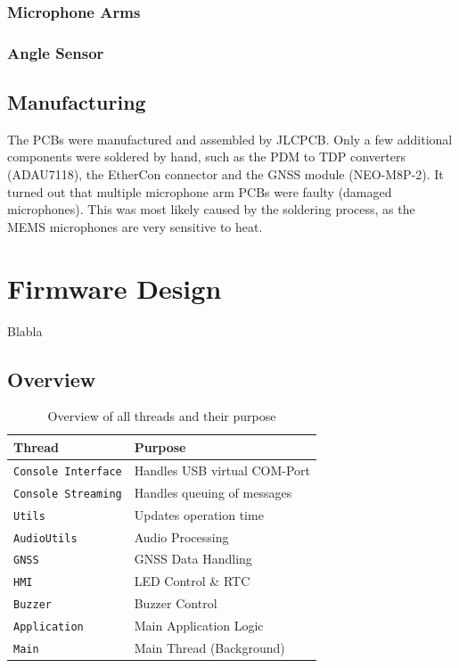 \subsubsection{Microphone Arms}

\subsubsection{Angle Sensor}

\subsection{Manufacturing}
The PCBs were manufactured and assembled by JLCPCB.
Only a few additional components were soldered by hand, such as the PDM to TDP converters (ADAU7118), the EtherCon connector and the GNSS module (NEO-M8P-2).
It turned out that multiple microphone arm PCBs were faulty (damaged microphones).
This was most likely caused by the soldering process, as the MEMS microphones are very sensitive to heat.

\section{Firmware Design}
Blabla

\subsection{Overview}

\begin{table}[h]
	\centering
	\begin{tabular}{|l|l|}
		\hline
		Thread                     & Purpose                      \\ \hline
		\texttt{Console Interface} & Handles USB virtual COM-Port \\ \hline
		\texttt{Console Streaming} & Handles queuing of messages  \\ \hline
		\texttt{Utils}             & Updates operation time       \\ \hline
		\texttt{AudioUtils}        & Audio Processing             \\ \hline
		\texttt{GNSS}              & GNSS Data Handling           \\ \hline
		\texttt{HMI}               & LED Control \& RTC           \\ \hline
		\texttt{Buzzer}            & Buzzer Control               \\ \hline
		\texttt{Application}       & Main Application Logic       \\ \hline
		\texttt{Main}              & Main Thread (Background)     \\ \hline
	\end{tabular}
	\caption{Overview of all threads and their purpose}
	\label{tab:threads}
\end{table}



